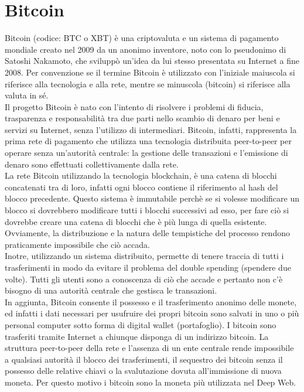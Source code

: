 \section{Bitcoin}
\label{sec:bitcoin}
Bitcoin (codice: BTC o XBT) è una criptovaluta e un sistema di pagamento mondiale creato nel 2009 da un anonimo inventore, noto con lo pseudonimo di Satoshi Nakamoto, che sviluppò un'idea da lui stesso presentata su Internet a fine 2008. Per convenzione se il termine Bitcoin è utilizzato con l'iniziale maiuscola si riferisce alla tecnologia e alla rete, mentre se minuscola (bitcoin) si riferisce alla valuta in sé.\cite{wiki-bitcoin}
\\Il progetto Bitcoin è nato con l'intento di risolvere i problemi di fiducia, trasparenza e responsabilità tra due parti nello scambio di denaro per beni e servizi su Internet, senza l’utilizzo di intermediari. Bitcoin, infatti, rappresenta la prima rete di pagamento che utilizza una tecnologia distribuita peer-to-peer per operare senza un'autorità centrale: la gestione delle transazioni e l'emissione di denaro sono effettuati collettivamente dalla rete.
\\La rete Bitcoin utilizzando la tecnologia blockchain, è una catena di blocchi concatenati tra di loro, infatti ogni blocco contiene il riferimento al hash del blocco precedente. Questo sistema è immutabile perchè se si volesse modificare un blocco si dovrebbero modificare tutti i blocchi successivi ad esso, per fare ciò si dovrebbe creare una catena di blocchi che è più lunga di quella esistente. Ovviamente, la distribuzione e la natura delle tempistiche del processo rendono praticamente impossibile che ciò accada.
\\Inotre, utilizzando un sistema distribuito, permette di tenere traccia di tutti i trasferimenti in modo da evitare il problema del double spending (spendere due volte). Tutti gli utenti sono a conoscenza di ciò che accade e pertanto non c’è bisogno di una autorità centrale che gestisca le transazioni.
\\In aggiunta, Bitcoin consente il possesso e il trasferimento anonimo delle monete, ed infatti i dati necessari per usufruire dei propri bitcoin sono salvati in uno o più personal computer sotto forma di digital wallet (portafoglio). I bitcoin sono trasferiti tramite Internet a chiunque disponga di un indirizzo bitcoin. La struttura peer-to-peer della rete e l’assenza di un ente centrale rende impossibile a qualsiasi autorità il blocco dei trasferimenti, il sequestro dei bitcoin senza il possesso delle relative chiavi o la svalutazione dovuta all’immissione di nuova moneta. Per questo motivo i bitcoin sono la moneta più utilizzata nel Deep Web.
